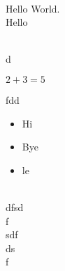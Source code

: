 \documentclass{article}
\begin{document}
\\
Hello World.\\
Hello\\
\\
\begin{comment}
 And so is this one
...

\end{comment}
d

  $2+3=5$

fdd

\begin{itemize}
\item  Hi
\item  Bye
\item  le

\end{itemize}\\
dfsd\\
f\\
sdf\\
ds\\
f\\
\end{document}
